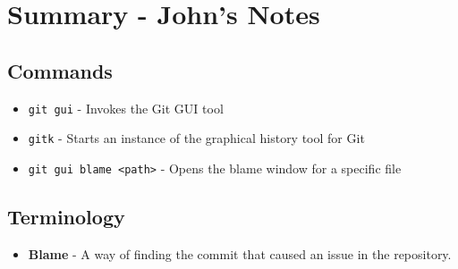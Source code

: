 \clearpage
\section{Summary - John's Notes}
\subsection{Commands}
\begin{itemize}
\item\texttt{git gui} - Invokes the Git GUI tool
\item\texttt{gitk} - Starts an instance of the graphical history tool for Git
\item\texttt{git gui blame <path>} - Opens the blame window for a specific file
\end{itemize}

\subsection{Terminology}
\begin{itemize}
\item\textbf{Blame} - A way of finding the commit that caused an issue in the repository.
\end{itemize}

